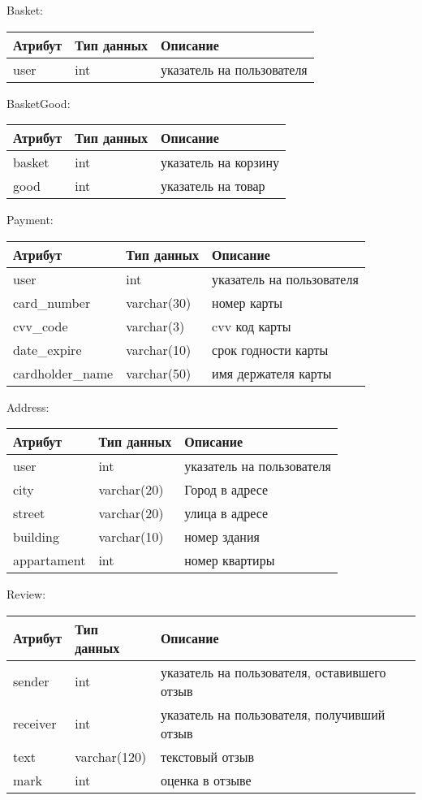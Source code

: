 Basket:

\begin{tabular}{ | l | l | l | }
    \hline
    Атрибут & Тип данных & Описание  \\ \hline
    user & int & указатель на пользователя \\
    \hline
\end{tabular}

BasketGood:

\begin{tabular}{ | l | l | l | }
    \hline
    Атрибут & Тип данных & Описание  \\ \hline
    basket & int & указатель на корзину \\ \hline
    good & int & указатель на товар \\
    \hline
\end{tabular}

Payment:

\begin{tabular}{ | l | l | l | }
    \hline
    Атрибут & Тип данных & Описание  \\ \hline
    user & int & указатель на пользователя \\ \hline
    card\_number & varchar(30) & номер карты \\ \hline
    cvv\_code & varchar(3) & cvv код карты \\ \hline
    date\_expire & varchar(10) & срок годности карты \\ \hline
    cardholder\_name & varchar(50) & имя держателя карты \\
    \hline
\end{tabular}

Address:

\begin{tabular}{ | l | l | l | }
    \hline
    Атрибут & Тип данных & Описание  \\ \hline
    user & int & указатель на пользователя \\ \hline
    city & varchar(20) & Город в адресе \\ \hline
    street & varchar(20) & улица в адресе \\ \hline
    building & varchar(10) & номер здания  \\ \hline
    appartament & int & номер квартиры \\
    \hline
\end{tabular}
\bigbreak

Review:

\begin{tabular}{ | l | l | l | }
    \hline
    Атрибут & Тип данных & Описание  \\ \hline
    sender & int & указатель на пользователя, оставившего отзыв \\ \hline
    receiver & int & указатель на пользователя, получивший отзыв \\ \hline
    text & varchar(120) & текстовый отзыв \\ \hline
    mark & int & оценка в отзыве \\
    \hline
\end{tabular}
\bigbreak

